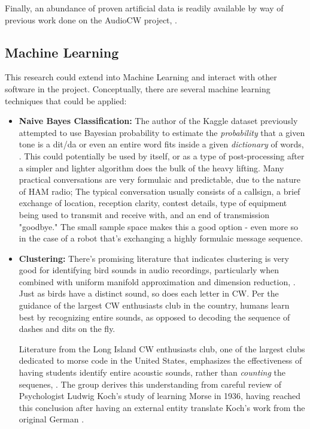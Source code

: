 \documentclass[11pt]{article}
\begin{document}
Finally, an abundance of proven artificial data is readily available by way of previous work done on the AudioCW project, \autocite{audioCW}.
\subsection{Machine Learning}
\label{sec:org25ab842}
This research could extend into Machine Learning and interact with other software in the project.
Conceptually, there are several machine learning techniques that could be applied:

\begin{itemize}
\item \textbf{Naive Bayes Classification:}
The author of the Kaggle dataset previously attempted to use Bayesian probability to estimate the \emph{probability} that
a given tone is a dit/da or even an entire word fits inside a given \emph{dictionary} of words, \autocite{a1gleblog}. This could potentially
be used by itself, or as a type of post-processing after a simpler and lighter algorithm does the bulk of the
heavy lifting. Many practical conversations are very formulaic and predictable, due to the nature of HAM radio;
The typical conversation usually consists of a callsign, a brief exchange of location, reception clarity, contest details,
type of equipment being used to transmit and receive with, and an end of transmission "goodbye." The small sample space makes
this a good option - even more so in the case of a robot that's exchanging a highly formulaic message sequence.

\item \textbf{Clustering:}
There's promising literature that indicates clustering is very good for identifying bird sounds in audio recordings,
particularly when combined with uniform manifold approximation and dimension reduction, \autocite{RSoundAnalysis}.
Just as birds have a distinct sound, so does each letter in CW. Per the guidance of the largest CW enthusiasts club in the country,
humans learn best by recognizing entire sounds, as opposed to decoding the sequence of dashes and dits on the fly.

Literature from the Long Island CW enthusiasts club, one of the largest clubs dedicated to morse code in the United States,
emphasizes the effectiveness of having students identify entire acoustic sounds, rather than \emph{counting} the sequenes, \autocite{LICWTrainingMaterials}.
The group derives this understanding from careful review of Psychologist Ludwig Koch's study of learning Morse in 1936, having
reached this conclusion after having an external entity translate Koch's work from the original German \autocite{KochReport}.
\end{itemize}
\end{document}
